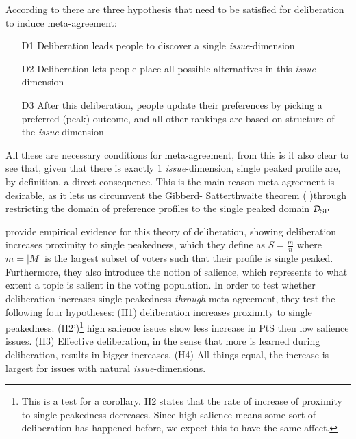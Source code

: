 According to \citet{listTwoConceptsAgreement2002} there are three hypothesis that need to be satisfied for deliberation to induce meta-agreement:
\begin{enumerate}
	\label{list:meta-agreement-checklist}
	\setlength\itemsep{1px}
	\item [D1] Deliberation leads people to discover a single \textit{issue}-dimension
	\item [D2] Deliberation lets people place all possible alternatives in this \textit{issue}-dimension
	\item [D3] After this deliberation, people update their preferences by picking a preferred (peak) outcome, and all other rankings are based on structure of the \textit{issue}-dimension
\end{enumerate}

All these are necessary conditions for meta-agreement, from this is it also clear to see that, given that there is exactly 1 \textit{issue}-dimension, single peaked profile are, by definition, a direct consequence. This is the main reason meta-agreement is desirable, as it lets us circumvent the Gibberd- Satterthwaite theorem (\citep{gibbardManipulationVotingSchemes1973} \citep{satterthwaiteStrategyproofnessArrowsConditions1975})through restricting the domain of preference profiles to the single peaked domain $\mathcal{D}_{\text{SP}}$


\citet{listDeliberationSinglePeakednessPossibility2013} provide empirical evidence for this theory of deliberation, showing deliberation increases proximity to single peakedness, which they define as $S= \frac{m}{n}$ where $m = |M|$ is the largest subset of voters such that their profile is single peaked. Furthermore, they also introduce the notion of salience, which represents to what extent a topic is salient in the voting population. In order to test whether deliberation increases single-peakedness \textit{through} meta-agreement, they test the following four hypotheses: (H1) deliberation increases proximity to single peakedness. (H2')\footnote{This is a test for a corollary. H2 states that the rate of increase of proximity to single peakedness decreases. Since high salience means some sort of deliberation has happened before, we expect this to have the same affect.} high salience issues show less increase in PtS then low salience issues. (H3) Effective deliberation, in the sense that more is learned during deliberation, results in bigger increases. (H4) All things equal, the increase is largest for issues with natural \textit{issue}-dimensions.

